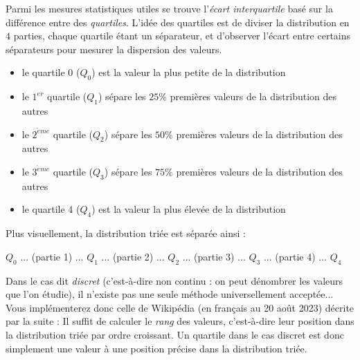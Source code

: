 \documentclass[11pt,a4paper]{article}
\begin{document}


\clearpage


Parmi les mesures statistiques utiles se trouve l'\textit{écart interquartile} basé sur la différence entre des \textit{quartiles}.
L'idée des quartiles est de diviser la distribution en $ 4 $ parties, chaque quartile étant un séparateur, et d'observer l'écart entre certains séparateurs pour mesurer la dispersion des valeurs.

\bigskip

\begin{itemize}
\item le quartile 0 ($Q_{0}$) est la valeur la plus petite de la distribution
\item le $ 1^{er} $ quartile ($Q_{1}$) sépare les $ 25\% $ premières valeurs de la distribution des autres
\item le $ 2^{\grave{e}me} $ quartile ($Q_{2}$) sépare les $ 50\% $ premières valeurs de la distribution des autres
\item le $ 3^{\grave{e}me} $ quartile ($Q_{3}$) sépare les $ 75\% $ premières valeurs de la distribution des autres
\item le quartile 4 ($Q_{4}$) est la valeur la plus élevée de la distribution
\end{itemize}

\bigskip

Plus visuellement, la distribution triée est séparée ainsi :

\begin{center}
$ Q_{0} $ ... (partie 1) ... $ Q_{1} $ ... (partie 2) ... $ Q_{2} $ ... (partie 3) ... $ Q_{3} $ ... (partie 4) ... $ Q_{4} $
\end{center}


\bigskip
\bigskip

Dans le cas dit \textit{discret} (c'est-à-dire non continu : on peut dénombrer les valeurs que l'on étudie), il n'existe pas une seule méthode universellement acceptée...
Vous implémenterez donc celle de Wikipédia (en français au 20 août 2023) décrite par la suite :
Il suffit de calculer le \textit{rang} des valeurs, c'est-à-dire leur position dans la distribution triée par ordre croissant.
Un quartile dans le cas discret est donc simplement une valeur à une position précise dans la distribution triée.
\end{document}
